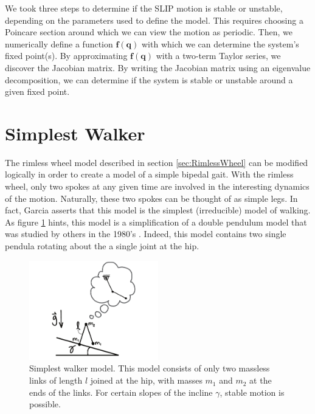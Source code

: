 
We took three steps to determine if the SLIP motion is stable or unstable,
depending on the parameters used to define the model. This requires choosing a
Poincare section around which we can view the motion as periodic. Then, we
numerically define a function $\mathbf{f}(\mathbf{q})$ with which we can
determine the system's fixed point(s). By approximating
$\mathbf{f}(\mathbf{q})$ with a two-term Taylor series, we discover the
Jacobian matrix. By writing the Jacobian matrix using an eigenvalue
decomposition, we can determine if the system is stable or unstable around a
given fixed point.

\section{Simplest Walker} %
\label{sec:SimplestWalker}

The rimless wheel model described in section \ref{sec:RimlessWheel} can be
modified logically in order to create a model of a simple bipedal gait. With
the rimless wheel, only two spokes at any given time are involved in the
interesting dynamics of the motion. Naturally, these two spokes can be thought
of as simple legs. In fact, Garcia \cite{garcia97} asserts that this model is
the simplest (irreducible) model of walking. As figure
\ref{fig:SimplestWalkerPendulum} hints, this model is a simplification of a
double pendulum model that was studied by others in the 1980's
. Indeed, this model contains two single pendula
rotating about the a single joint at the hip.

\begin{figure}[h]		%
\begin{centering}
\includegraphics[width=0.5\textwidth]{Figures/SimplestWalkerPendulum}\par
\end{centering}
\caption[Diagram: Simplest Walker Model]{Simplest walker model. This model
consists of only two massless links of length $l$ joined at the hip, with
masses $m_{1}$ and $m_{2}$ at the ends of the links. For certain slopes of the
incline $\gamma$, stable motion is possible.}
\label{fig:SimplestWalkerPendulum}
\end{figure}
%

